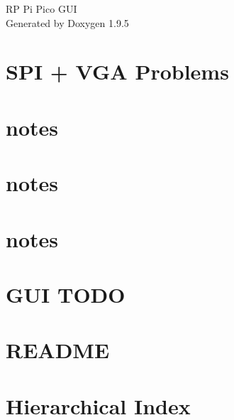 \documentclass[twoside]{book}
\newcommand{\+}{\discretionary{\mbox{\scriptsize$\hookleftarrow$}}{}{}}
\newcommand{\clearemptydoublepage}{%
    \newpage{\pagestyle{empty}\cleardoublepage}%
  }
\begin{document}
  \raggedbottom
    \hypersetup{pageanchor=false,
                bookmarksnumbered=true,
                pdfencoding=unicode
               }
  \begin{titlepage}
  \vspace*{7cm}
  \begin{center}%
  {\Large RP Pi Pico GUI}\\
  \vspace*{1cm}
  {\large Generated by Doxygen 1.9.5}\\
  \end{center}
  \end{titlepage}
  \clearemptydoublepage
  \tableofcontents
  \clearemptydoublepage
  \hypersetup{pageanchor=true}
\chapter{SPI + VGA Problems}
\label{md_dev_dev_notes}

\chapter{notes}
\label{md_dev_log_notes}

\chapter{notes}
\label{md_dev_photoshoot_notes}

\chapter{notes}
\label{md_dev_test_notes}

\chapter{GUI TODO}
\label{md_lib_gui_lib__t_o_d_o}

\chapter{README}
\label{md__r_e_a_d_m_e}

\chapter{Hierarchical Index}

\end{document}
